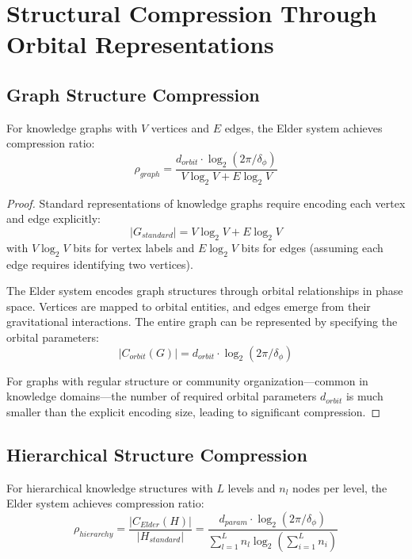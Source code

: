 \section{Structural Compression Through Orbital Representations}

\subsection{Graph Structure Compression}

\begin{theorem}
For knowledge graphs with $V$ vertices and $E$ edges, the Elder system achieves compression ratio:
\begin{equation}
\rho_{graph} = \frac{d_{orbit} \cdot \log_2(2\pi/\delta_{\phi})}{V \log_2 V + E \log_2 V}
\end{equation}
\end{theorem}

\begin{proof}
Standard representations of knowledge graphs require encoding each vertex and edge explicitly:
\begin{equation}
|G_{standard}| = V \log_2 V + E \log_2 V
\end{equation}
with $V \log_2 V$ bits for vertex labels and $E \log_2 V$ bits for edges (assuming each edge requires identifying two vertices).

The Elder system encodes graph structures through orbital relationships in phase space. Vertices are mapped to orbital entities, and edges emerge from their gravitational interactions. The entire graph can be represented by specifying the orbital parameters:
\begin{equation}
|C_{orbit}(G)| = d_{orbit} \cdot \log_2(2\pi/\delta_{\phi})
\end{equation}

For graphs with regular structure or community organization—common in knowledge domains—the number of required orbital parameters $d_{orbit}$ is much smaller than the explicit encoding size, leading to significant compression.
\end{proof}

\subsection{Hierarchical Structure Compression}

\begin{theorem}
For hierarchical knowledge structures with $L$ levels and $n_l$ nodes per level, the Elder system achieves compression ratio:
\begin{equation}
\rho_{hierarchy} = \frac{|C_{Elder}(H)|}{|H_{standard}|} = \frac{d_{param} \cdot \log_2(2\pi/\delta_{\phi})}{\sum_{l=1}^L n_l \log_2(\sum_{i=1}^L n_i)}
\end{equation}
\end{theorem}

